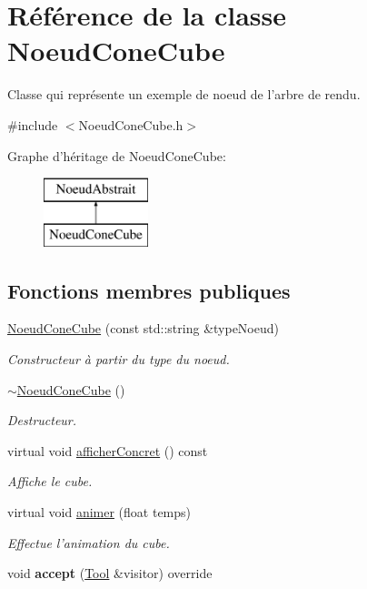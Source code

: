 \hypertarget{class_noeud_cone_cube}{\section{Référence de la classe Noeud\-Cone\-Cube}
\label{class_noeud_cone_cube}
}


Classe qui représente un exemple de noeud de l'arbre de rendu.  




{\ttfamily \#include $<$Noeud\-Cone\-Cube.\-h$>$}

Graphe d'héritage de Noeud\-Cone\-Cube\-:\begin{figure}[H]
\begin{center}
\leavevmode
\includegraphics[height=2.000000cm]{class_noeud_cone_cube}
\end{center}
\end{figure}
\subsection*{Fonctions membres publiques}
\begin{DoxyCompactItemize}
\item 
\hyperlink{group__inf2990_ga6f0bcd8b494e8aa6f3a8dad78bad2c0f}{Noeud\-Cone\-Cube} (const std\-::string \&type\-Noeud)
\begin{DoxyCompactList}\small\item\em Constructeur à partir du type du noeud. \end{DoxyCompactList}\item 
\hyperlink{group__inf2990_ga8db4b36c3469001f7dcfab23debe7d2f}{$\sim$\-Noeud\-Cone\-Cube} ()
\begin{DoxyCompactList}\small\item\em Destructeur. \end{DoxyCompactList}\item 
virtual void \hyperlink{group__inf2990_ga4b1f68c409f0b1c5eabd0be7822a36d2}{afficher\-Concret} () const 
\begin{DoxyCompactList}\small\item\em Affiche le cube. \end{DoxyCompactList}\item 
\hypertarget{group__inf2990_ga3472a200d45ce3cdff72d72921807b21}{virtual void \hyperlink{group__inf2990_ga3472a200d45ce3cdff72d72921807b21}{animer} (float temps)}\label{group__inf2990_ga3472a200d45ce3cdff72d72921807b21}

\begin{DoxyCompactList}\small\item\em Effectue l'animation du cube. \end{DoxyCompactList}\item 
\hypertarget{class_noeud_cone_cube_a057b05f07c3aef977e295b519969ae04}{void {\bfseries accept} (\hyperlink{class_tool}{Tool} \&visitor) override}\label{class_noeud_cone_cube_a057b05f07c3aef977e295b519969ae04}

\end{DoxyCompactItemize}
